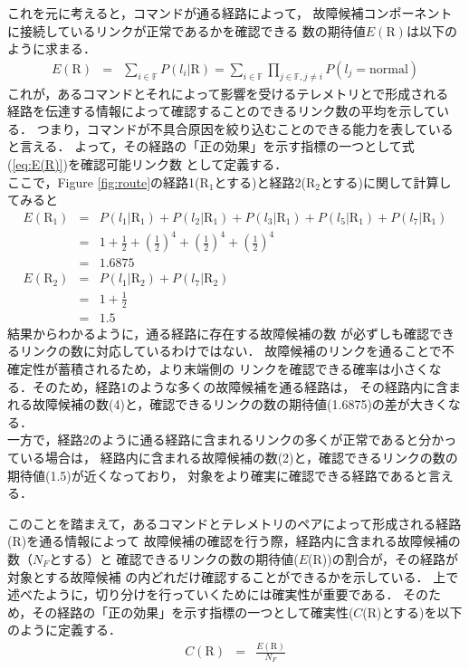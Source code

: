 \documentclass[11pt]{article}
\begin{document}
これを元に考えると，コマンドが通る経路によって，
故障候補コンポーネントに接続しているリンクが正常であるかを確認できる
数の期待値$E(\text{R})$は以下のように求まる．
\begin{eqnarray}
   E(\text{R})&=& \sum_{i\in \mathbb{F}}P(l_i|\text{R})
   = \sum_{i\in \mathbb{F}}\prod_{j\in \mathbb{F}, j\neq i} P(l_j=\text{normal}) \label{eq:E(R)}
\end{eqnarray}
これが，あるコマンドとそれによって影響を受けるテレメトリとで形成される
経路を伝達する情報によって確認することのできるリンク数の平均を示している．
つまり，コマンドが不具合原因を絞り込むことのできる能力を表していると言える．
よって，その経路の「正の効果」を示す指標の一つとして式(\ref{eq:E(R)})を確認可能リンク数
として定義する．\\
ここで，Figure \ref{fig:route}の経路1(R$_1$とする)と経路2(R$_2$とする)に関して計算してみると
\begin{eqnarray}
   E(\text{R}_1)  &=& P(l_{1} | \text{R}_1) + P(l_{2} | \text{R}_1) +P(l_{3} | \text{R}_1)
   +P(l_{5} | \text{R}_1) + P(l_{7} | \text{R}_1) \\
   &=& 1 + \frac{1}{2} + \left( \frac{1}{2}\right)^4 + \left( \frac{1}{2}\right)^4
    + \left( \frac{1}{2}\right)^4 \\
    &=& 1.6875 \\
   E(\text{R}_2)  &=& P(l_{1} | \text{R}_2) + P(l_{7} | \text{R}_2) \\
   &=& 1 + \frac{1}{2} \\
   &=& 1.5
\end{eqnarray}
結果からわかるように，通る経路に存在する故障候補の数
が必ずしも確認できるリンクの数に対応しているわけではない．
故障候補のリンクを通ることで不確定性が蓄積されるため，より末端側の
リンクを確認できる確率は小さくなる．そのため，経路1のような多くの故障候補を通る経路は，
その経路内に含まれる故障候補の数(4)と，確認できるリンクの数の期待値(1.6875)の差が大きくなる．\\
一方で，経路2のように通る経路に含まれるリンクの多くが正常であると分かっている場合は，
経路内に含まれる故障候補の数(2)と，確認できるリンクの数の期待値(1.5)が近くなっており，
対象をより確実に確認できる経路であると言える．

このことを踏まえて，あるコマンドとテレメトリのペアによって形成される経路(R)を通る情報によって
故障候補の確認を行う際，経路内に含まれる故障候補の数（$N_F$とする）と
確認できるリンクの数の期待値($E$(R))の割合が，その経路が対象とする故障候補
の内どれだけ確認することができるかを示している．
上で述べたように，切り分けを行っていくためには確実性が重要である．%
そのため，その経路の「正の効果」を示す指標の一つとして確実性($C$(R)とする)を以下のように定義する．
\begin{eqnarray}
   C(\text{R})  &=& \frac{E(\text{R})}{N_F}
\end{eqnarray}
\end{document}
